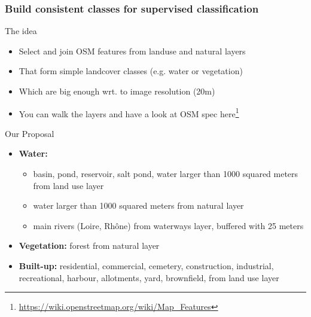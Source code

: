 \documentclass[8pt]{beamer}
\begin{document}
\begin{frame}[fragile]
\frametitle{Build consistent classes for supervised classification}
\begin{block}{The idea}
\begin{itemize}
\item Select and join OSM features from landuse and natural layers
\item That form simple landcover classes (e.g. water or vegetation)
\item Which are big enough wrt. to image resolution (20m)
\item You can walk the layers and have a look at OSM spec here\footnote{\url{https://wiki.openstreetmap.org/wiki/Map_Features}}
\end{itemize}
\end{block}

\begin{block}{Our Proposal}
\begin{itemize}
\item \textbf{Water:} 
  \begin{itemize}
  \item basin, pond, reservoir, salt pond, water larger than 1000 squared meters from land use layer
  \item water larger than 1000 squared meters from natural layer
  \item main rivers (Loire, Rhône) from waterways layer, buffered with 25 meters
  \end{itemize}
\item \textbf{Vegetation:} forest from natural layer
\item \textbf{Built-up:} residential, commercial, cemetery, construction, industrial, recreational, harbour, allotments, yard, brownfield, from land use layer
\end{itemize}
\end{block}

\end{frame}
\end{document}

